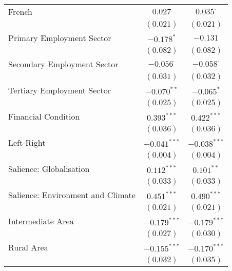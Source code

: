 \begin{center}
\begin{tiny}
\begin{longtable}{l@{} c@{} c@{}}
\quad French                                           & $0.027$          & $0.035^{\cdot}$  \\
                                                       & $(0.021)$        & $(0.021)$        \\
\quad Primary Employment Sector                        & $-0.178^{*}$     & $-0.131$         \\
                                                       & $(0.082)$        & $(0.082)$        \\
\quad Secondary Employment Sector                      & $-0.056^{\cdot}$ & $-0.058^{\cdot}$ \\
                                                       & $(0.031)$        & $(0.032)$        \\
\quad Tertiary Employment Sector                       & $-0.070^{**}$    & $-0.065^{*}$     \\
                                                       & $(0.025)$        & $(0.025)$        \\
\quad Financial Condition                              & $0.393^{***}$    & $0.422^{***}$    \\
                                                       & $(0.036)$        & $(0.036)$        \\
\quad Left-Right                                       & $-0.041^{***}$   & $-0.038^{***}$   \\
                                                       & $(0.004)$        & $(0.004)$        \\
\quad Salience: Globalisation                          & $0.112^{***}$    & $0.101^{**}$     \\
                                                       & $(0.033)$        & $(0.033)$        \\
\quad Salience: Environment and Climate                & $0.451^{***}$    & $0.490^{***}$    \\
                                                       & $(0.021)$        & $(0.021)$        \\
\quad Intermediate Area                                & $-0.179^{***}$   & $-0.179^{***}$   \\
                                                       & $(0.027)$        & $(0.030)$        \\
\quad Rural Area                                       & $-0.155^{***}$   & $-0.170^{***}$   \\
                                                       & $(0.032)$        & $(0.035)$        \\

\end{longtable}
\end{tiny}
\end{center}
